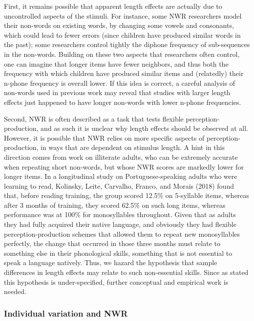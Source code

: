 \documentclass[
  american,
  ,man,floatsintext]{apa6}
\begin{document}
First, it remains possible that apparent length effects are actually due to uncontrolled aspects of the stimuli. For instance, some NWR researchers model their non-words on existing words, by changing some vowels and consonants, which could lead to fewer errors (since children have produced similar words in the past); some researchers control tightly the diphone frequency of sub-sequences in the non-words. Building on these two aspects that researchers often control, one can imagine that longer items have fewer neighbors, and thus both the frequency with which children have produced similar items and (relatedly) their n-phone frequency is overall lower. If this idea is correct, a careful analysis of non-words used in previous work may reveal that studies with larger length effects just happened to have longer non-words with lower n-phone frequencies.

Second, NWR is often described as a task that tests flexible perception-production, and as such it is unclear why length effects should be observed at all. However, it is possible that NWR relies on more specific aspects of perception-production, in ways that are dependent on stimulus length. A hint in this direction comes from work on illiterate adults, who can be extremely accurate when repeating short non-words, but whose NWR scores are markedly lower for longer items. In a longitudinal study on Portuguese-speaking adults who were learning to read, Kolinsky, Leite, Carvalho, Franco, and Morais (2018) found that, before reading training, the group scored 12.5\% on 5-syllable items, whereas after 3 months of training, they scored 62.5\% on such long items, whereas performance was at 100\% for monosyllables throughout. Given that as adults they had fully acquired their native language, and obviously they had flexible perception-production schemes that allowed them to repeat new monosyllables perfectly, the change that occurred in those three months must relate to something else in their phonological skills, something that is not essential to speak a language natively. Thus, we hazard the hypothesis that sample differences in length effects may relate to such non-essential skills. Since as stated this hypothesis is under-specified, further conceptual and empirical work is needed.

\hypertarget{individual-variation-and-nwr-1}{%
\subsubsection{Individual variation and NWR}\label{individual-variation-and-nwr-1}}
\end{document}
